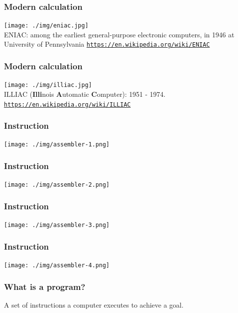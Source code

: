 \documentclass[11pt]{beamer}
\begin{document}
\begin{frame}[fragile]
  \frametitle{Modern calculation}

  \texttt{[image: ./img/eniac.jpg]}\\
  {\small ENIAC: among the earliest general-purpose electronic computers, in 1946 at University of Pennsylvania}
   \textcolor{\CSBase}{\small \texttt{\url{https://en.wikipedia.org/wiki/ENIAC}}}
\end{frame}

\begin{frame}[fragile]
	\frametitle{Modern calculation}
	
	\texttt{[image: ./img/illiac.jpg]}\\
	{\small ILLIAC ({\bf Illi}nois {\bf A}utomatic {\bf C}omputer): 1951 - 1974. }
	\textcolor{\CSBase}{\small \texttt{\url{https://en.wikipedia.org/wiki/ILLIAC}}}
\end{frame}


\begin{frame}[fragile]
  \frametitle{Instruction}

  \texttt{[image: ./img/assembler-1.png]}
\end{frame}

\begin{frame}[fragile]
  \frametitle{Instruction}

  \texttt{[image: ./img/assembler-2.png]}
\end{frame}

\begin{frame}[fragile]
  \frametitle{Instruction}

  \texttt{[image: ./img/assembler-3.png]}
\end{frame}

\begin{frame}[fragile]
  \frametitle{Instruction}

  \texttt{[image: ./img/assembler-4.png]}
\end{frame}


\begin{frame}
  \frametitle{What is a program?}
  \Enlarge

  \begin{itemize} \pause
    \myitem A set of instructions a computer executes to achieve a goal.
  \end{itemize}
\end{frame}
\end{document}
